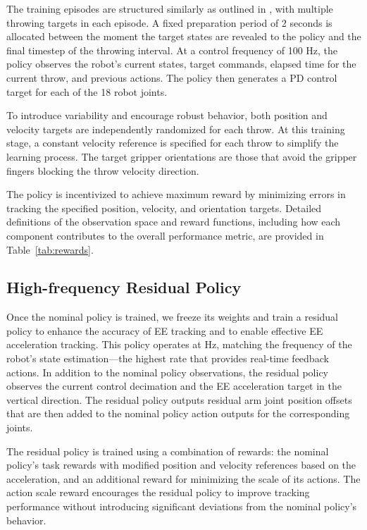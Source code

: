 \documentclass[letterpaper, 10 pt, conference]{ieeeconf} %
\begin{document}
The training episodes are structured similarly as outlined in \cite{ma2025badminton}, with multiple throwing targets in each episode. A fixed preparation period of 2 seconds is allocated between the moment the target states are revealed to the policy and the final timestep of the throwing interval. At a control frequency of 100 Hz, the policy observes the robot’s current states, target commands, elapsed time for the current throw, and previous actions. The policy then generates a PD control target for each of the 18 robot joints.

To introduce variability and encourage robust behavior, both position and velocity targets are independently randomized for each throw. At this training stage, a constant velocity reference is specified for each throw to simplify the learning process. The target gripper orientations are those that avoid the gripper fingers blocking the throw velocity direction.

The policy is incentivized to achieve maximum reward by minimizing errors in tracking the specified position, velocity, and orientation targets. Detailed definitions of the observation space and reward functions, including how each component contributes to the overall performance metric, are provided in Table~\ref{tab:rewards}.




\subsection{High-frequency Residual Policy}

Once the nominal policy is trained, we freeze its weights and train a residual policy to enhance the accuracy of EE tracking and to enable effective EE acceleration tracking. This policy operates at \unit[400]{Hz}, matching the frequency of the robot’s state estimation—the highest rate that provides real-time feedback actions. In addition to the nominal policy observations, the residual policy observes the current control decimation and the EE acceleration target in the vertical direction. The residual policy outputs residual arm joint position offsets that are then added to the nominal policy action outputs for the corresponding joints.

The residual policy is trained using a combination of rewards: the nominal policy’s task rewards with modified position and velocity references based on the acceleration, and an additional reward for minimizing the scale of its actions. The action scale reward encourages the residual policy to improve tracking performance without introducing significant deviations from the nominal policy’s behavior.
\end{document}
